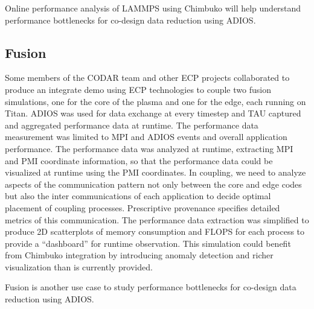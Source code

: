 Online performance analysis of LAMMPS using Chimbuko will help understand performance bottlenecks for co-design data reduction using ADIOS.

\subsection{Fusion}
Some members of the CODAR team and other ECP projects collaborated to produce an integrate demo using ECP technologies to couple two fusion simulations, one for the core of the plasma and one for the edge, each running on Titan.  ADIOS was used for data exchange at every timestep and TAU captured and aggregated performance data at runtime. The performance data measurement was limited to MPI and ADIOS events and overall application performance.  The performance data was analyzed at runtime, extracting MPI and PMI coordinate information, so that the performance data could be visualized at runtime using the PMI coordinates.  In coupling, we need to analyze aspects of the communication pattern not only between the core and edge codes but also the inter communications of each application to decide optimal placement of coupling processes.  Prescriptive provenance specifies detailed metrics of this communication. 
The performance data extraction was simplified to produce 2D scatterplots of memory consumption and FLOPS for each process to provide a ``dashboard'' for runtime observation.  This simulation could benefit from Chimbuko integration by introducing anomaly detection and richer visualization than is currently provided. 

Fusion is another use case to study performance bottlenecks for co-design data reduction using ADIOS.

